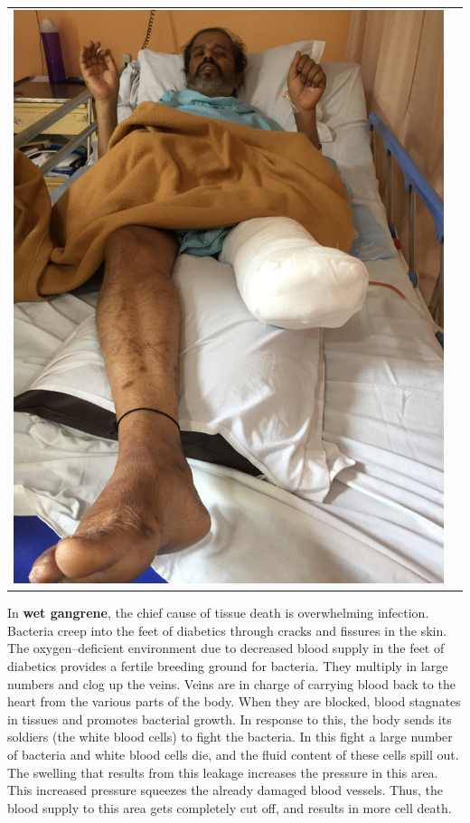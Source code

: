 \begin{center}
\begin{tabular}{@{}cc@{}}
\includegraphics[scale=.9]{images/068a.jpg}
\end{tabular}
\end{center}

In \textbf{wet gangrene}, the chief cause of tissue death is overwhel\-ming infection. Bacteria creep into the feet of diabetics through cracks and fissures in the skin. The oxygen–deficient environment due to decrea\-sed blood supply in the feet of diabetics provides a fertile breeding ground for bacteria. They multiply in large numbers and clog up the veins. Veins are in charge of carrying blood back to the heart from the various parts of the body. When they are blocked, blood stagnates in tissues and promotes bacterial growth. In response to this, the body sends its soldiers (the white blood cells) to fight the bacteria. In this fight a large number of bacteria and white blood cells die, and the fluid content of these cells spill out. The swelling that results from this leakage increases the pressure in this area. This increased pressure squeezes the already damaged blood vessels. Thus, the blood supply to this area gets completely cut off, and results in more cell death.

